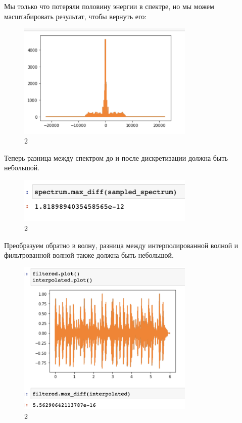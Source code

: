 \documentclass[10pt,a4paper,oneside]{article}
\begin{document}
Мы только что потеряли половину энергии в спектре, но мы можем масштабировать результат, чтобы вернуть его:

\begin{figure}[H]
        \centering
        \includegraphics[width=0.75\textwidth]{pics/7.png}
        \caption{2}
        \label{fig:first}
\end{figure}

Теперь разница между спектром до и после дискретизации должна быть небольшой.

\begin{figure}[H]
        \centering
        \includegraphics[width=0.75\textwidth]{pics/8.png}
        \caption{2}
        \label{fig:first}
\end{figure}

Преобразуем обратно в волну, разница между интерполированной волной и фильтрованной волной также должна быть небольшой.

\begin{figure}[H]
        \centering
        \includegraphics[width=0.75\textwidth]{pics/9.png}
        \caption{2}
        \label{fig:first}
\end{figure}
\end{document}
